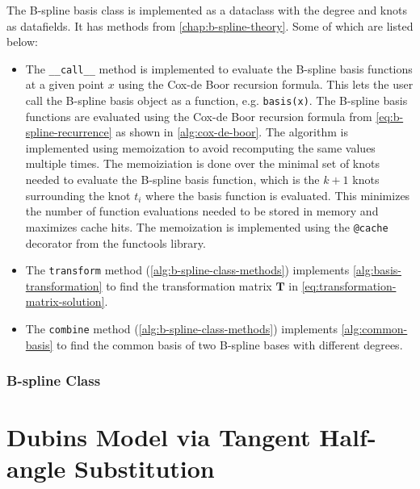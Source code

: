 The B-spline basis class is implemented as a dataclass with the degree and knots as datafields. It has methods from \cref{chap:b-spline-theory}. Some of which are listed below:
\begin{itemize}
    \item 
    The \texttt{\_\_call\_\_} method is implemented to evaluate the B-spline basis functions at a given point $x$ using the Cox-de Boor recursion formula. This lets the user call the B-spline basis object as a function, e.g. \texttt{basis(x)}. The B-spline basis functions are evaluated using the Cox-de Boor recursion formula from \cref{eq:b-spline-recurrence} as shown in \cref{alg:cox-de-boor}. The algorithm is implemented using memoization to avoid recomputing the same values multiple times. The memoiziation is done over the minimal set of knots needed to evaluate the B-spline basis function, which is the $k+1$ knots surrounding the knot $t_i$ where the basis function is evaluated. This minimizes the number of function evaluations needed to be stored in memory and maximizes cache hits. The memoization is implemented using the \texttt{@cache} decorator from the functools library.
    \item
    The \texttt{transform} method (\cref{alg:b-spline-class-methods}) implements \cref{alg:basis-transformation} to find the transformation matrix $\mathbf T$ in \cref{eq:transformation-matrix-solution}.
    \item
    The \texttt{combine} method (\cref{alg:b-spline-class-methods}) implements \cref{alg:common-basis} to find the common basis of two B-spline bases with different degrees. 
\end{itemize}


\FloatBarrier
\subsection{B-spline Class}



\chapter{Dubins Model via Tangent Half-angle Substitution}\label{app:tangent-half-angle}

